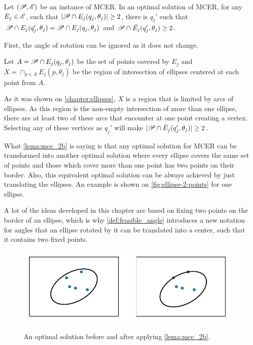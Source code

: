 \begin{proposicao}\label{lema:mce_2b}
	Let $(\mathscr{P}, \mathscr{E})$ be an instance of MCER. In an optimal solution of MCER, for any $E_j \in \mathscr{E}$, such that $|\mathscr{P} \cap E_j(q_j, \theta_j)|\ge2$, there is $q_j'$ such that $\mathscr{P} \cap E_j(q_j', \theta_j)=\mathscr{P} \cap E_j(q_j, \theta_j)$ and $\mathscr{P} \cap \tilde{E_j}(q_j', \theta_j) \ge 2$.
\end{proposicao}

\begin{demonstracao}
	First, the angle of rotation can be ignored as it does not change.
	
	Let $A=\mathscr{P} \cap E_j(q_j, \theta_j)$ be the set of points covered by $E_j$ and $X=\cap_{p \in A}E_j(p, \theta_j)$ be the region of intersection of ellipses centered at each point from $A$.

	As it was shown on \autoref{chapter:ellipses}, $X$ is a region that is limited by arcs of ellipses. As this region is the non-empty intersection of more than one ellipse, there are at least two of these arcs that encounter at one point creating a vertex. Selecting any of these vertices as $q_j'$ will make $|\mathscr{P} \cap \tilde{E}_j(q_j', \theta_j)| \ge 2$.
	
\end{demonstracao}

What \autoref{lema:mce_2b} is saying is that any optimal solution for MCER can be transformed into another optimal solution where every ellipse covers the same set of points and those which cover more than one point has two points on their border. Also, this equivalent optimal solution can be always achieved by just translating the ellipses. An example is shown on \autoref{fig:ellipse-2-points} for one ellipse.

A lot of the ideas developed in this chapter are based on fixing two points on the border of an ellipse, which is why \autoref{def:feasible_angle} introduces a new notation for angles that an ellipse rotated by it can be translated into a center, such that it contains two fixed points. 

\begin{figure}[H]
	\centering
	\caption{An optimal solution before and after applying \autoref{lema:mce_2b}.}
	\includegraphics{tex/figures/scripts/ellipse-2-points}
	\fautor
	\label{fig:ellipse-2-points}
\end{figure}

